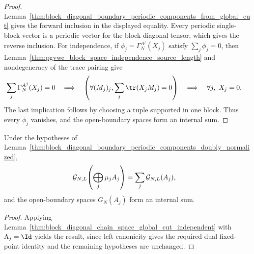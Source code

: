 \begin{proof}
    \leanok
    Lemma~\ref{thm:block_diagonal_boundary_periodic_components_from_global_cut}
    gives the forward inclusion in the displayed equality. Every periodic
    single-block vector is a periodic vector for the block-diagonal tensor,
    which gives the reverse inclusion.
    For independence, if $\phi_j=\Gamma_N^{A^j}(X_j)$ satisfy
    $\sum_j\phi_j=0$, then Lemma~\ref{thm:pgvwc_block_space_independence_source_length} and
    nondegeneracy of the trace pairing give
    \begin{align}
        \sum_j\Gamma_N^{A^j}(X_j)=0
         & \quad\Longrightarrow\quad
        \left(\forall (M_j)_j,
        \sum_j\tr(X_jM_j)=0\right)
        \quad\Longrightarrow\quad
        \forall j,\ X_j=0.
        \notag
    \end{align}
    The last implication follows by choosing a tuple supported in one block.
    Thus every $\phi_j$ vanishes, and the open-boundary spaces form an internal
    sum.
\end{proof}

\begin{lemma}
    \label{thm:block_diagonal_chain_space_global_cut_independent_doubly_normalized}
    \leanok
    Under the hypotheses of
    Lemma~\ref{thm:block_diagonal_boundary_periodic_components_doubly_normalized},
    \begin{align}
        \mathcal G_{N,L}\!\left(\bigoplus_j\mu_jA_j\right)
         & =
        \sum_j\mathcal G_{N,L}(A_j),
        \notag
    \end{align}
    and the open-boundary spaces $G_N(A_j)$ form an internal sum.
\end{lemma}

\begin{proof}\leanok
    Applying
    Lemma~\ref{thm:block_diagonal_chain_space_global_cut_independent}
    with $\Lambda_j=\Id$ yields the result, since left canonicity gives the
    required dual fixed-point identity and the remaining hypotheses are
    unchanged.
\end{proof}

